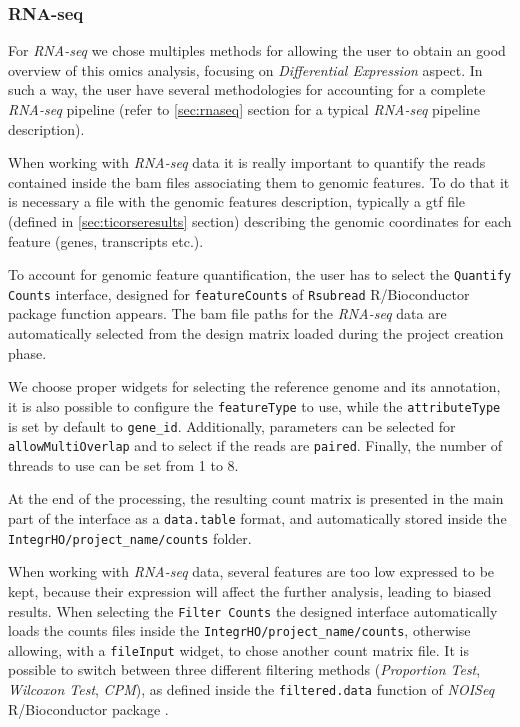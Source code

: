 \subsubsection{RNA-seq} \label{sec:integrhorna}
For \textit{RNA-seq} we chose multiples methods for allowing the user to obtain an good overview of this omics analysis, focusing on \textit{Differential Expression} aspect.
In such a way, the user have several methodologies for accounting for a complete \textit{RNA-seq} pipeline (refer to \ref{sec:rnaseq} section for a typical \textit{RNA-seq} pipeline description).



When working with \textit{RNA-seq} data it is really important to quantify the reads contained inside the \gls{bam} files associating them to genomic features.
To do that it is necessary a file with the genomic features description, typically a \gls{gtf} file (defined in \ref{sec:ticorseresults} section) describing the genomic coordinates for each feature (genes, transcripts etc.).

To account for genomic feature quantification, the user has to select the \lstinline!Quantify Counts! interface, designed for \lstinline!featureCounts! of \lstinline!Rsubread! R/Bioconductor package function \cite{Liao2014} appears.
The  \gls{bam} file paths for the \textit{RNA-seq} data are automatically selected from the design matrix loaded during the project creation phase.

We choose proper widgets for selecting the reference genome and its annotation, it is also possible to configure the \lstinline!featureType! to use, while the \lstinline!attributeType! is set by default to \lstinline!gene_id!.
Additionally, parameters can be selected for \lstinline!allowMultiOverlap! and to select if the reads are \lstinline!paired!.
Finally, the number of threads to use can be set from 1 to 8.

At the end of the processing, the resulting count matrix is presented in the main part of the interface as a \lstinline!data.table! format, and automatically stored inside the \lstinline!IntegrHO/project_name/counts! folder.



When working with \textit{RNA-seq} data, several features are too low expressed to be kept, because their expression will affect the further analysis, leading to biased results.
When selecting the \lstinline!Filter Counts! the designed interface automatically loads the counts files inside the \lstinline!IntegrHO/project_name/counts!, otherwise allowing, with a \lstinline!fileInput! widget, to chose another count matrix file.
It is possible to switch between three different filtering methods (\textit{Proportion Test}, \textit{Wilcoxon Test}, \textit{CPM}), as defined inside the \lstinline!filtered.data! function of \textit{NOISeq} R/Bioconductor package \cite{Tarazona2012}.

